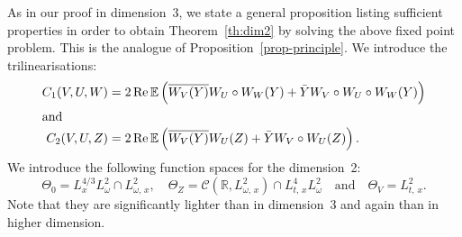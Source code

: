 \documentclass[10pt]{amsart}
\theoremstyle{definition}\newtheorem{defi}[theo]{Definition}\newtheorem{rema}[theo]{Remark}\newtheorem{exam}[theo]{Example}\newtheorem{exem}[theo]{Example}\newtheorem{nota}[theo]{Notation}
\newcommand{\R}{\mathbb{R}}
\newcommand{\E}{\mathbb{E}}
\DeclareMathOperator{\re}{Re}
\newcommand{\mclC}{\mathcal{C}}
\begin{document}
As in our proof in dimension~$3$, we state a general proposition listing sufficient properties in order to obtain Theorem~\ref{th:dim2} by solving the above fixed point problem. This is the analogue of Proposition~\ref{prop-principle}. We introduce the trilinearisations:
\begin{align*}
C_1(V,U,W) &= 2 \re \E\left(\overline{W_V(Y)} W_U \circ W_W(Y) + \bar Y W_V \circ W_U \circ W_W(Y)\right)
\\
\intertext{and}
C_2(V,U,Z) &= 2\re \E\left(\overline{W_V(Y)} W_U(Z) + \bar Y W_V\circ W_U(Z)\right).
\end{align*}
We introduce the following function spaces for the dimension~2:
\begin{equation} \label{def:spacesd2}
\Theta_0 = L^{4/3}_x L^2_\omega \cap L^2_{\omega,\,x}, \quad \Theta_Z = \mclC\left(\R, L^2_{\omega,\,x}\right) \cap L^4_{t,\,x} L^2_\omega \quad \text{and}\quad \Theta_V = L^2_{t,\,x}.
\end{equation}
Note that they are significantly lighter than in dimension~3 and again than in higher dimension.
\vspace{8pt}
\pagebreak
\end{document}

